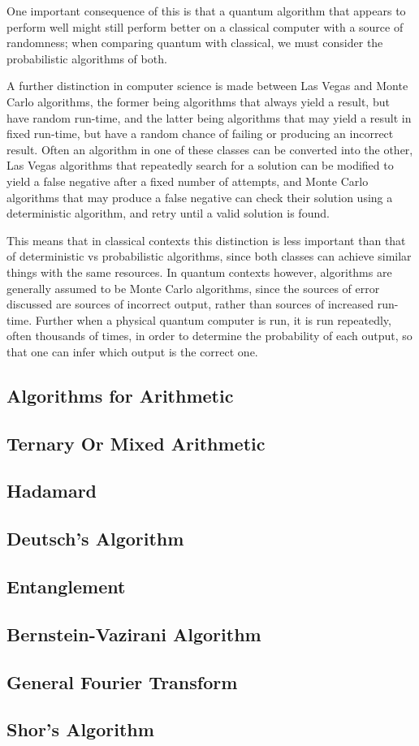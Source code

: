 \documentclass[]{article}
\begin{document}
One important consequence of this is that a quantum algorithm that appears to perform well might still perform better on a classical computer with a source of randomness; when comparing quantum with classical, we must consider the probabilistic algorithms of both.

A further distinction in computer science is made between Las Vegas and Monte Carlo algorithms, the former being algorithms that always yield a result, but have random run-time, and the latter being algorithms that may yield a result in fixed run-time, but have a random chance of failing or producing an incorrect result. Often an algorithm in one of these classes can be converted into the other, Las Vegas algorithms that repeatedly search for a solution can be modified to yield a false negative after a fixed number of attempts, and Monte Carlo algorithms that may produce a false negative can check their solution using a deterministic algorithm, and retry until a valid solution is found.

This means that in classical contexts this distinction is less important than that of deterministic vs probabilistic algorithms, since both classes can achieve similar things with the same resources. In quantum contexts however, algorithms are generally assumed to be Monte Carlo algorithms, since the sources of error discussed are sources of incorrect output, rather than sources of increased run-time. Further when a physical quantum computer is run, it is run repeatedly, often thousands of times, in order to determine the probability of each output, so that one can infer which output is the correct one.

\subsection{Algorithms for Arithmetic}
\subsection{Ternary Or Mixed Arithmetic}

\subsection{Hadamard}
\subsection{Deutsch's Algorithm}

\subsection{Entanglement}
\subsection{Bernstein-Vazirani Algorithm}

\subsection{General Fourier Transform}
\subsection{Shor's Algorithm}
\end{document}
